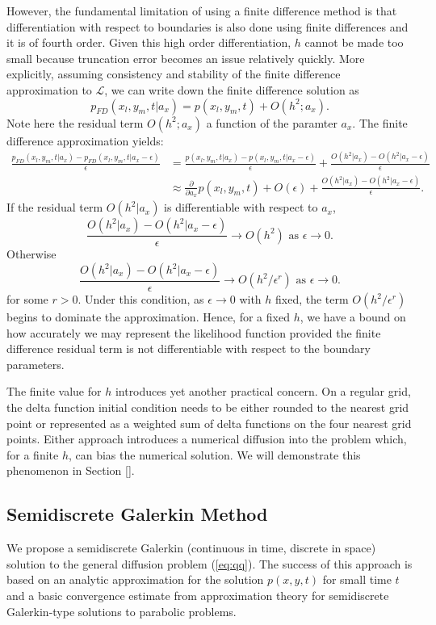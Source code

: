 \documentclass[10pt]{article}
\begin{document}
However, the fundamental limitation of using a finite difference
method is that differentiation with respect to boundaries is also done
using finite differences and it is of fourth order. Given this high
order differentiation, $h$ cannot be made too small because truncation
error becomes an issue relatively quickly. More explicitly, assuming
consistency and stability of the finite difference approximation to
$\mathcal{L}$, we can write down the finite difference solution as
\[
  p_{FD}(x_l,y_m,t | a_x) = p(x_l,y_m,t) + O(h^2; a_x).
\]
Note here the residual term $O(h^2; a_x)$ a function of the paramter
$a_x$. The finite difference approximation yields:
\begin{align*}
  \frac{p_{FD}(x_l,y_m,t | a_x) - p_{FD}(x_l,y_m,t | a_x - \epsilon)}{\epsilon} &= \frac{p(x_l,y_m,t | a_x) - p(x_l,y_m,t | a_x - \epsilon)}{\epsilon} + \frac{O(h^2 | a_x) - O(h^2 | a_x - \epsilon)}{\epsilon} \\
      &\approx \frac{\partial}{\partial a_x} p(x_l,y_m,t) + O(\epsilon) + \frac{O(h^2 | a_x) - O(h^2 | a_x - \epsilon)}{\epsilon}.
\end{align*}
If the residual term $O(h^2 | a_x)$ is differentiable with respect to
$a_x$,
\[
  \frac{O(h^2 | a_x) - O(h^2 | a_x - \epsilon)}{\epsilon} \to O(h^2) \mbox{ as } \epsilon \to 0.
\]
Otherwise
\[
  \frac{O(h^2 | a_x) - O(h^2 | a_x - \epsilon)}{\epsilon} \to O(h^2/\epsilon^r) \mbox{ as } \epsilon \to 0.
\]
for some $r > 0$. Under this condition, as $\epsilon \to 0$ with $h$
fixed, the term $O(h^2/\epsilon^r)$ begins to dominate the
approximation. Hence, for a fixed $h$, we have a bound on how
accurately we may represent the likelihood function provided the
finite difference residual term is not differentiable with respect to
the boundary parameters.

The finite value for $h$ introduces yet another practical concern. On
a regular grid, the delta function initial condition needs to be
either rounded to the nearest grid point or represented as a weighted
sum of delta functions on the four nearest grid points. Either
approach introduces a numerical diffusion into the problem which, for
a finite $h$, can bias the numerical solution. We will demonstrate
this phenomenon in Section [].

\subsection{Semidiscrete Galerkin Method}
We propose a semidiscrete Galerkin (continuous in time, discrete in
space) solution to the general diffusion problem (\ref{eq:qq}). The
success of this approach is based on an analytic approximation for the
solution $p(x,y,t)$ for small time $t$ and a basic convergence
estimate from approximation theory for semidiscrete Galerkin-type
solutions to parabolic problems. 
\end{document}
